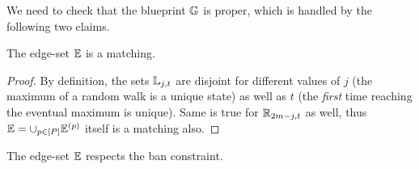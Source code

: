 We need to check that the blueprint $\mathbb{G}$ is proper, which is handled by the following two claims. 

\begin{claim}\label{clm:bG-matching}
	The edge-set $\mathbb{E}$ is a matching. 
\end{claim}
\begin{proof}
	By definition, the sets $\mathbb{L}_{j,t}$ are disjoint for different values of $j$ (the maximum of a random walk is a unique state) as well as $t$ (the \emph{first} time reaching the eventual maximum is unique). Same is true for $\mathbb{R}_{2m-j,t}$ as well, 
	thus $\mathbb{E} = \cup_{p \in [P]} \mathbb{E}^{(p)}$ itself is a matching also.  
\end{proof}



\begin{claim}\label{clm:bG-ban}
	The edge-set $\mathbb{E}$ respects the ban constraint. 
\end{claim}
